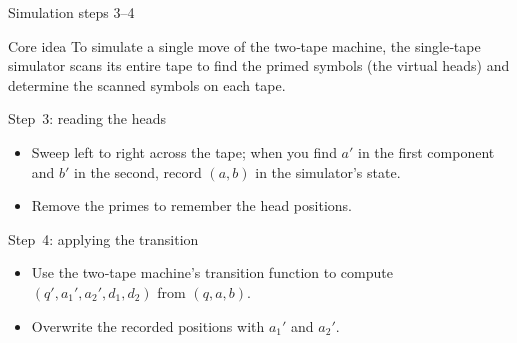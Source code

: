 \begin{frame}[t]{Simulation steps 3–4}
  \begin{tblock}{Core idea}
    To simulate a single move of the two‑tape machine, the single‑tape
    simulator scans its entire tape to find the primed symbols (the
    virtual heads) and determine the scanned symbols on each tape.
  \end{tblock}
  \begin{tblock}{Step 3: reading the heads}
    \begin{itemize}
      \item Sweep left to right across the tape; when you find $a'$ in
        the first component and $b'$ in the second, record $(a,b)$ in
        the simulator’s state.
      \item Remove the primes to remember the head positions.
    \end{itemize}
  \end{tblock}
  \begin{tblock}{Step 4: applying the transition}
    \begin{itemize}
      \item Use the two‑tape machine’s transition function to compute
        $(q',a_1',a_2',d_1,d_2)$ from $(q,a,b)$.
      \item Overwrite the recorded positions with $a_1'$ and $a_2'$.
    \end{itemize}
  \end{tblock}
  \label{fr:7.5-06}
\end{frame}

